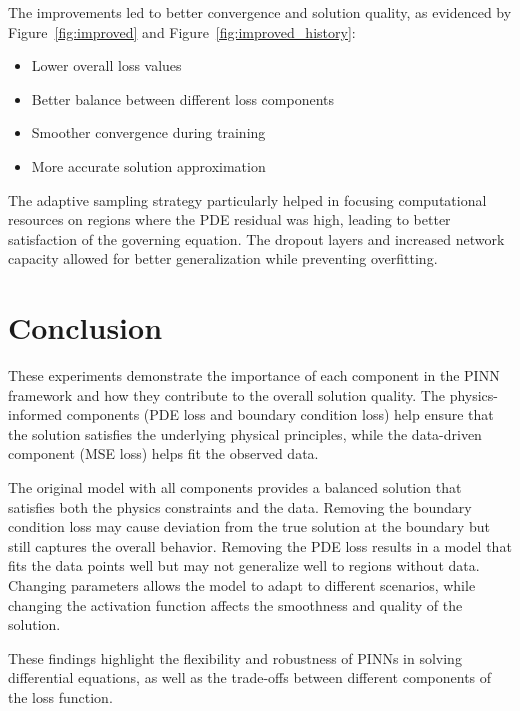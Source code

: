 \documentclass[11pt,a4paper]{article}
\begin{document}
The improvements led to better convergence and solution quality, as evidenced by Figure~\ref{fig:improved} and Figure~\ref{fig:improved_history}:
\begin{itemize}
    \item Lower overall loss values
    \item Better balance between different loss components
    \item Smoother convergence during training
    \item More accurate solution approximation
\end{itemize}

The adaptive sampling strategy particularly helped in focusing computational resources on regions where the PDE residual was high, leading to better satisfaction of the governing equation. The dropout layers and increased network capacity allowed for better generalization while preventing overfitting.

\section{Conclusion}
These experiments demonstrate the importance of each component in the PINN framework and how they contribute to the overall solution quality. The physics-informed components (PDE loss and boundary condition loss) help ensure that the solution satisfies the underlying physical principles, while the data-driven component (MSE loss) helps fit the observed data.

The original model with all components provides a balanced solution that satisfies both the physics constraints and the data. Removing the boundary condition loss may cause deviation from the true solution at the boundary but still captures the overall behavior. Removing the PDE loss results in a model that fits the data points well but may not generalize well to regions without data. Changing parameters allows the model to adapt to different scenarios, while changing the activation function affects the smoothness and quality of the solution.

These findings highlight the flexibility and robustness of PINNs in solving differential equations, as well as the trade-offs between different components of the loss function.
\end{document}
